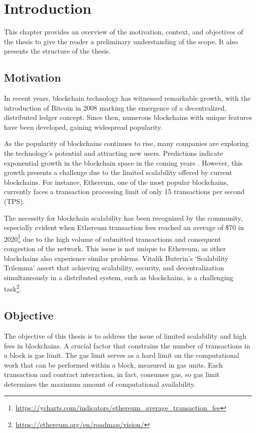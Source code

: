 \chapter{Introduction}\label{cha:chapter1}

This chapter provides an overview of the motivation, context, and objectives of the thesis to give the reader a preliminary understanding of the scope. It also presents the structure of the thesis.

\section{Motivation}\label{sec:moti}

In recent years, blockchain technology has witnessed remarkable growth, with the introduction of Bitcoin in 2008 \cite{nakamoto_bitcoin_2008} marking the emergence of a decentralized, distributed ledger concept. Since then, numerous blockchains with unique features have been developed, gaining widespread popularity.

As the popularity of blockchains continues to rise, many companies are exploring the technology's potential and attracting new users. Predictions indicate exponential growth in the blockchain space in the coming years \cite{noauthor_global_nodate}. However, this growth presents a challenge due to the limited scalability offered by current blockchains. For instance, Ethereum, one of the most popular blockchains, currently faces a transaction processing limit of only 15 transactions per second (TPS).

The necessity for blockchain scalability has been recognized by the community, especially evident when Ethereum transaction fees reached an average of \$70 in 2020\footnote{\url{https://ycharts.com/indicators/ethereum_average_transaction_fee}} due to the high volume of submitted transactions and consequent congestion of the network. This issue is not unique to Ethereum, as other blockchains also experience similar problems. Vitalik Buterin's `Scalability Trilemma' assert that achieving scalability, security, and decentralization simultaneously in a distributed system, such as blockchains, is a challenging task\footnote{\url{https://ethereum.org/en/roadmap/vision/}}.

\section{Objective}\label{sec:objective}

The objective of this thesis is to address the issue of limited scalability and high fees in blockchains. A crucial factor that constrains the number of transactions in a block is gas limit. The gas limit serves as a hard limit on the computational work that can be performed within a block, measured in gas units. Each transaction and contract interaction, in fact, consumes gas, so gas limit determines the maximum amount of computational availability.

